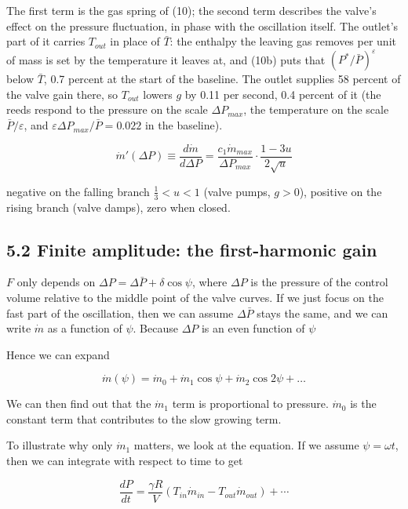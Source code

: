 \documentclass[11pt]{article}
\begin{document}
The first term is the gas spring of (10); the second term describes the valve's effect on the pressure fluctuation, in phase with the oscillation itself. The outlet's part of it carries $T_{out}$ in place of $\bar T$: the enthalpy the leaving gas removes per unit of mass is set by the temperature it leaves at, and (10b) puts that $(P^*/\bar P)^{\varepsilon}$ below $\bar T$, 0.7 percent at the start of the baseline. The outlet supplies 58 percent of the valve gain there, so $T_{out}$ lowers $g$ by 0.11 per second, 0.4 percent of it (the reeds respond to the pressure on the scale $\Delta P_{max}$, the temperature on the scale $\bar P/\varepsilon$, and $\varepsilon\Delta P_{max}/\bar P = 0.022$ in the baseline).

\begin{equation}
\dot m'(\Delta P) \equiv \frac{d\dot m}{d\Delta P} = \frac{c_1\dot m_{max}}{\Delta P_{max}}\cdot\frac{1 - 3u}{2\sqrt u} \tag{15}
\end{equation}

negative on the falling branch $\frac13 < u < 1$ (valve pumps, $g > 0$), positive on the rising branch (valve damps), zero when closed.

\subsection*{5.2 Finite amplitude: the first-harmonic gain}

$F$ only depends on $\Delta P = \Delta \bar{P} + \delta \cos\psi$, where $\Delta P$ is the pressure of the control volume relative to the middle point of the valve curves. If we just focus on the fast part of the oscillation, then we can assume $ \Delta \bar{P}$ stays the same, and we can write $\dot m$ as a function of $\psi$. Because $\Delta P$ is an even function of $\psi$

Hence we can expand

\[
\dot m(\psi) = \dot m_{0} + \dot m_{1} \cos \psi + \dot m_{2} \cos 2 \psi + \ldots
\]

We can then find out that the $\dot m_1$ term is proportional to pressure. $\dot m_0$ is the constant term that contributes to the slow growing term.

To illustrate why only $\dot m_1$ matters, we look at the equation. If we assume $\psi = \omega t$, then we can integrate with respect to time to get

\[
\frac{d P}{d t}=\frac{\gamma R}{V}\left(T_{in} \dot m_{in} - T_{out} \dot m_{out}\right) + \cdots
\]
\end{document}
